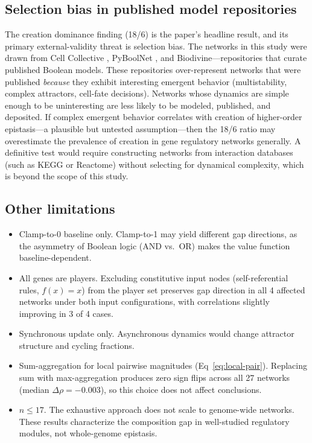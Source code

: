\documentclass[10pt,letterpaper]{article}
\begin{document}
\subsection*{Selection bias in published model repositories}

The creation dominance finding (18/6) is the paper's headline result,
and its primary external-validity threat is selection bias.
The networks in this study were drawn from Cell Collective
\cite{helikar2012cell}, PyBoolNet \cite{klarner2017pyboolnet}, and
Biodivine---repositories that curate published Boolean models. These
repositories over-represent networks that were published \emph{because}
they exhibit interesting emergent behavior (multistability, complex
attractors, cell-fate decisions). Networks whose dynamics are simple
enough to be uninteresting are less likely to be modeled, published,
and deposited. If complex emergent behavior correlates with creation
of higher-order epistasis---a plausible but untested assumption---then
the 18/6 ratio may overestimate the prevalence of creation in gene
regulatory networks generally. A definitive test would require
constructing networks from interaction databases (such as KEGG or
Reactome) without selecting for dynamical complexity, which is beyond
the scope of this study.

\subsection*{Other limitations}

\begin{itemize}
\item Clamp-to-0 baseline only. Clamp-to-1 may yield different gap
  directions, as the asymmetry of Boolean logic (AND vs.\ OR) makes
  the value function baseline-dependent.
\item All genes are players. Excluding constitutive input nodes
  (self-referential rules, $f(x) = x$) from the player set preserves
  gap direction in all 4 affected networks under both input
  configurations, with correlations slightly improving in 3 of 4
  cases.
\item Synchronous update only. Asynchronous dynamics would change
  attractor structure and cycling fractions.
\item Sum-aggregation for local pairwise magnitudes
  (Eq~\ref{eq:local-pair}). Replacing sum with max-aggregation
  produces zero sign flips across all 27 networks (median $\Delta\rho
  = -0.003$), so this choice does not affect conclusions.
\item $n \leq 17$. The exhaustive approach does not scale to
  genome-wide networks. These results characterize the composition
  gap in well-studied regulatory modules, not whole-genome epistasis.
\end{itemize}
\end{document}
